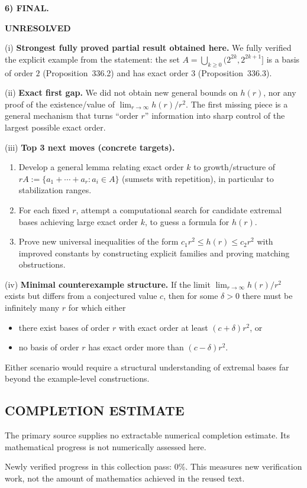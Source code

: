 \medskip
\noindent\textbf{6) FINAL.}

\noindent\textbf{UNRESOLVED}

\smallskip
\noindent (i) \textbf{Strongest fully proved partial result obtained here.}
We fully verified the explicit example from the statement: the set $A=\bigcup_{k\ge 0}(2^{2k},2^{2k+1}]$ is a basis of order $2$ (Proposition~336.2) and has exact order $3$ (Proposition~336.3).

\smallskip
\noindent (ii) \textbf{Exact first gap.}
We did not obtain new general bounds on $h(r)$, nor any proof of the existence/value of $\lim_{r\to\infty}h(r)/r^2$. The first missing piece is a general mechanism that turns ``order $r$'' information into sharp control of the largest possible exact order.

\smallskip
\noindent (iii) \textbf{Top 3 next moves (concrete targets).}
\begin{enumerate}
\item Develop a general lemma relating exact order $k$ to growth/structure of $rA:=\{a_1+\cdots+a_r: a_i\in A\}$ (sumsets with repetition), in particular to stabilization ranges.
\item For each fixed $r$, attempt a computational search for candidate extremal bases achieving large exact order $k$, to guess a formula for $h(r)$.
\item Prove new universal inequalities of the form $c_1 r^2\le h(r)\le c_2 r^2$ with improved constants by constructing explicit families and proving matching obstructions.
\end{enumerate}

\smallskip
\noindent (iv) \textbf{Minimal counterexample structure.}
If the limit $\lim_{r\to\infty}h(r)/r^2$ exists but differs from a conjectured value $c$, then for some $\delta>0$ there must be infinitely many $r$ for which either
\begin{itemize}
\item there exist bases of order $r$ with exact order at least $(c+\delta)r^2$, or
\item no basis of order $r$ has exact order more than $(c-\delta)r^2$.
\end{itemize}
Either scenario would require a structural understanding of extremal bases far beyond the example-level constructions.




\subsection*{COMPLETION ESTIMATE}
The primary source supplies no extractable numerical completion estimate. Its mathematical progress is not numerically assessed here.

Newly verified progress in this collection pass: $0\%$. This measures new verification work, not the amount of mathematics achieved in the reused text.
